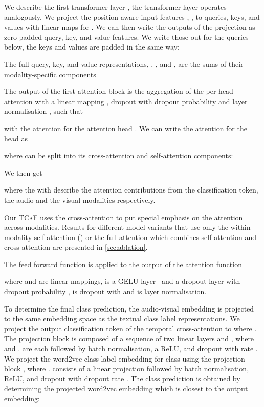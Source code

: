 \documentclass[runningheads]{llncs}
\newcommand{\mypara}[1]{\noindent{\bf{#1}}}
\newcommand{\modelName}{\textsc{TCaF}\xspace}
\begin{document}
We describe the first transformer layer , the transformer layer  operates analogously. 
We project the position-aware input features , ,  to queries, keys, and values with linear maps  for . We can then write the outputs of the projection as zero-padded query, key, and value features. We write those out for the queries below, the keys and values are padded in the same way:

The full query, key, and value representations, , , and , are the sums of their modality-specific components
 
The output of the first attention block  is the aggregation of the per-head attention with a linear mapping ,  dropout with dropout probability  and layer normalisation  \cite{ba2016layer}, such that

with the attention  for the attention head .
We can write the attention for the head  as 

where  can be split into its cross-attention and self-attention components:


We then get

where the  with  describe the attention contributions from the classification token, the audio and the visual modalities respectively.

Our \modelName uses the cross-attention  to put special emphasis on the attention across modalities. 
Results for different model variants that use only the within-modality self-attention () or the full attention which combines self-attention and cross-attention are presented in \cref{sec:ablation}. 

\mypara{Feed forward function.} The feed forward function  is applied to the output of the attention function

where  and  are linear mappings,  is a GELU layer~\cite{hendrycks2016gaussian} and a dropout layer with dropout probability ,  is dropout with  and  is layer normalisation. 

\mypara{Output prediction.}
To determine the final class prediction, the audio-visual embedding is projected to the same embedding space as the textual class label representations.
We project the output classification token  of the temporal cross-attention to  where . The projection block is composed of a sequence of two linear layers  and , where  and .  are each followed by batch normalisation, a ReLU, and dropout with rate .
We project the word2vec class label embedding   for class  using the projection block , where .  consists of a linear projection followed by batch normalisation, ReLU, and dropout with dropout rate .
The class prediction  is obtained by determining the projected word2vec embedding which is closest to the output embedding: 
\end{document}

